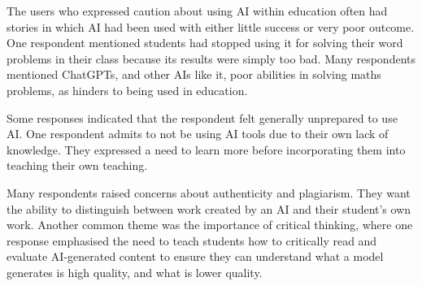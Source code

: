 The users who expressed caution about using AI within education often had stories in which AI had been used with either little success or very poor outcome. One respondent mentioned students had stopped using it for solving their word problems in their class because its results were simply too bad. Many respondents mentioned ChatGPTs, and other AIs like it, poor abilities in solving maths problems, as hinders to being used in education.


Some responses indicated that the respondent felt generally unprepared to use AI. One respondent admits to not be using AI tools due to their own lack of knowledge. They expressed a need to learn more before incorporating them into teaching their own teaching.


Many respondents raised concerns about authenticity and plagiarism. They want the ability to distinguish between work created by an AI and their student’s own work. Another common theme was the importance of critical thinking, where one response emphasised the need to teach students how to critically read and evaluate AI-generated content to ensure they can understand what a model generates is high quality, and what is lower quality.














\cleardoublepage
